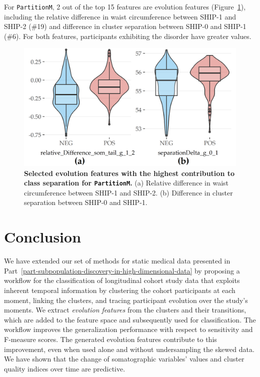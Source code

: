 \documentclass[
  oneside]{book}
\begin{document}
For \texttt{PartitionM}, 2 out of the top 15 features are evolution features (Figure~\ref{fig:06-imp-features-men}), including the relative difference in waist circumference between SHIP-1 and SHIP-2 (\#19) and difference in cluster separation between SHIP-0 and SHIP-1 (\#6).
For both features, participants exhibiting the disorder have greater values.



\begin{figure}[htb]

{\centering \includegraphics[width=1\linewidth]{figures/06-imp-features-men} 

}

\caption{\textbf{Selected evolution features with the highest contribution to class separation for \texttt{PartitionM}.} (a) Relative difference in waist circumference between SHIP-1 and SHIP-2. (b) Difference in cluster separation between SHIP-0 and SHIP-1.}\label{fig:06-imp-features-men}
\end{figure}

\hypertarget{evo-conclusion}{%
\section{Conclusion}\label{evo-conclusion}}

We have extended our set of methods for static medical data presented in Part~\ref{part-subpopulation-discovery-in-high-dimensional-data} by proposing a workflow for the classification of longitudinal cohort study data that exploits inherent temporal information by clustering the cohort participants at each moment, linking the clusters, and tracing participant evolution over the study's moments.
We extract \emph{evolution features} from the clusters and their transitions, which are added to the feature space and subsequently used for classification.
The workflow improves the generalization performance with respect to sensitivity and F-measure scores.
The generated evolution features contribute to this improvement, even when used alone and without undersampling the skewed data.
We have shown that the change of somatographic variables' values and cluster quality indices over time are predictive.
\end{document}
